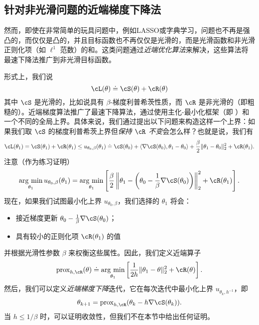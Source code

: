 \documentclass[../../book-main_zh.tex]{subfiles}
\begin{document}
\subsection{针对非光滑问题的近端梯度下降法}\label{subsec:pgd}

然而，即使在非常简单的玩具问题中，例如LASSO或字典学习，问题也不再是强凸的，而仅仅是凸的，并且目标函数也不再仅仅是光滑的，而是光滑函数和非光滑正则化项（如 \(\ell^{1}\) 范数）的和。这类问题通过\textit{近端优化算法}来解决，这些算法将最速下降法推广到非光滑目标函数。

形式上，我们说
\begin{equation}
    \cL(\theta) \doteq \cS(\theta) + \cR(\theta)
\end{equation}
其中 \(\cS\) 是光滑的，比如说具有 \(\beta\)-梯度利普希茨性质，而 \(\cR\) 是非光滑的（即粗糙的）。近端梯度算法推广了最速下降算法，通过使用主化-最小化框架（即 ）和一个不同的全局上界。具体来说，我们通过提出以下问题来构造这样一个上界：如果我们取 \(\cS\) 的梯度利普希茨上界但\textit{保持 \(\cR\) 不变}会怎么样？也就是说，我们有
\begin{equation}
    \cL(\theta_{1}) = \cS(\theta_{1}) + \cR(\theta_{1}) \leq u_{\theta_{0}, \beta}(\theta_{1}) \doteq \cS(\theta_{0}) + \ip{\nabla \cS(\theta_{0})}{\theta_{1} - \theta_{0}} + \frac{\beta}{2}\norm{\theta_{1} - \theta_{0}}_{2}^{2} + \cR(\theta_{1}).
\end{equation}
注意（作为练习证明）
\begin{equation}
    \argmin_{\theta_{1}}u_{\theta_{0}, \beta}(\theta_{1}) = \argmin_{\theta_{1}}\bs{\frac{\beta}{2}\norm*{\theta_{1} - \bp{\theta_{0} - \frac{1}{\beta}\nabla \cS(\theta_{0})}}_{2}^{2} + \cR(\theta_{1})}.
\end{equation}
现在，如果我们试图最小化上界 \(u_{\theta_{0}, \beta}\)，我们选择的 \(\theta_{1}\) 将会：
\begin{itemize}
    \item 接近梯度更新 \(\theta_{0} - \frac{1}{\beta}\nabla \cS(\theta_{0})\)；
    \item 具有较小的正则化项 \(\cR(\theta_{1})\) 的值
\end{itemize}
并根据光滑性参数 \(\beta\) 来权衡这些属性。因此，我们定义近端算子
\begin{equation}
    \prox_{h, \cR}(\theta) \doteq \argmin_{\theta_{1}}\bs{\frac{1}{2h}\norm{\theta_{1} - \theta}_{2}^{2} + \cR(\theta)}.
\end{equation}
然后，我们可以定义\textit{近端梯度下降}迭代，它在每次迭代中最小化上界 \(u_{\theta_{k}, h^{-1}}\)，即
\begin{equation}
    \theta_{k + 1} = \prox_{h, \cR}(\theta_{k} - h\nabla \cS(\theta_{k})).
\end{equation}
当 \(h \leq 1/\beta\) 时，可以证明收敛性，但我们不在本节中给出任何证明。
\end{document}

